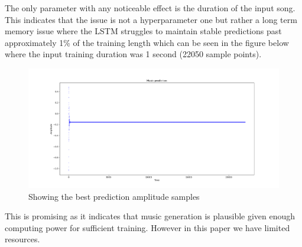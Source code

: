 \documentclass{article}
\begin{document}
The only parameter with any noticeable effect is the duration of the input song. This indicates that the issue is not a hyperparameter one but rather a long term memory issue where the LSTM struggles to maintain stable predictions past approximately 1\% of the training length which can be seen in the figure below where the input training duration was 1 second (22050 sample points).  
\begin{figure}[H]
\centering
\caption{Showing the best prediction amplitude samples}
\includegraphics[scale=0.35]{better_convergence.png}
\end{figure}
This is promising as it indicates that music generation is plausible given enough computing power for sufficient training. However in this paper we have limited resources. 
\end{document}
